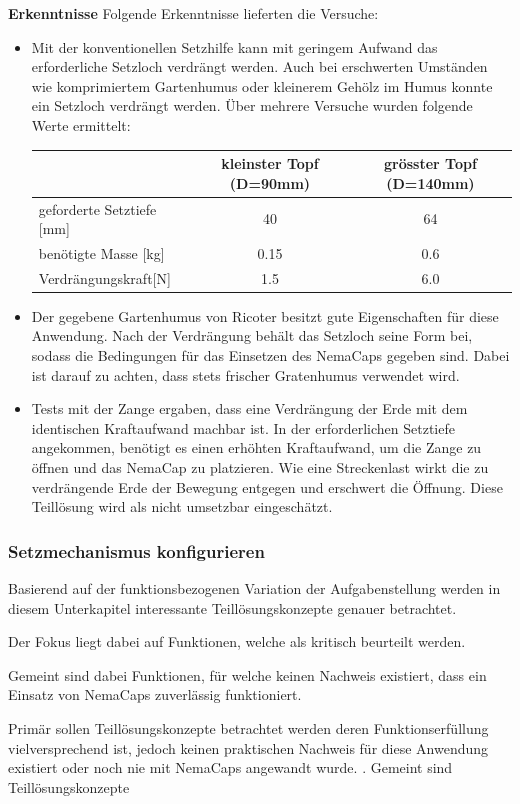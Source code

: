 \textbf{Erkenntnisse}
\newline
Folgende Erkenntnisse lieferten die Versuche:
\begin{itemize}
	\item Mit der konventionellen Setzhilfe kann mit geringem Aufwand das erforderliche Setzloch verdrängt werden. Auch bei erschwerten Umständen wie komprimiertem Gartenhumus oder kleinerem Gehölz im Humus konnte ein Setzloch verdrängt werden. Über mehrere Versuche wurden folgende Werte ermittelt:
	\begin{tabular}{|l|c|c|}
		\hline 
		& kleinster Topf (D=90mm) & grösster Topf (D=140mm) \\ 
		\hline 
		geforderte Setztiefe [mm] & 40 & 64 \\ 
		\hline 
		benötigte Masse [kg] & 0.15 & 0.6 \\ 
		\hline 
		Verdrängungskraft[N] & 1.5  & 6.0  \\ 
		\hline 
	\end{tabular} 
	
	\item Der gegebene Gartenhumus von Ricoter besitzt gute Eigenschaften für diese Anwendung. Nach der Verdrängung behält das Setzloch seine Form bei, sodass die Bedingungen für das Einsetzen des NemaCaps gegeben sind. Dabei ist darauf zu achten, dass stets frischer Gratenhumus verwendet wird.
	
	\item Tests mit der Zange ergaben, dass eine Verdrängung der Erde mit dem identischen Kraftaufwand machbar ist. In der erforderlichen Setztiefe angekommen, benötigt es einen erhöhten Kraftaufwand, um die Zange zu öffnen und das NemaCap zu platzieren. Wie eine Streckenlast wirkt die zu verdrängende Erde der Bewegung entgegen und erschwert die Öffnung. Diese Teillösung wird als nicht umsetzbar eingeschätzt.
\end{itemize} 

\subsubsection{Setzmechanismus konfigurieren}







Basierend auf der funktionsbezogenen Variation der Aufgabenstellung werden in diesem Unterkapitel interessante Teillösungskonzepte genauer betrachtet.

Der Fokus liegt dabei auf Funktionen, welche als kritisch beurteilt werden.


 Gemeint sind dabei Funktionen, für welche keinen Nachweis existiert, dass ein Einsatz von NemaCaps zuverlässig funktioniert.

 Primär sollen Teillösungskonzepte betrachtet werden deren Funktionserfüllung vielversprechend ist, jedoch keinen praktischen Nachweis für diese Anwendung existiert oder noch nie mit NemaCaps angewandt wurde. . Gemeint sind Teillösungskonzepte